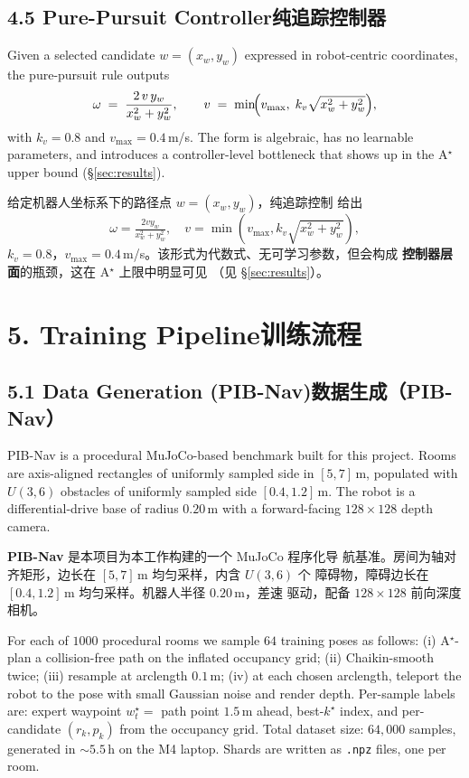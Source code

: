 \documentclass[11pt,a4paper]{article}
\providecommand{\citep}[1]{\cite{#1}}
\newcommand{\en}[1]{\par\noindent #1\par\vspace{0.15em}}
\newcommand{\zh}[1]{\par\noindent\color{zhcol}\hspace{0.5em}#1\par\color{black}\vspace{0.6em}}
\newcommand{\bisec}[2]{\section[#1]{#1\quad\normalfont\small\color{zhcol}\textsf{#2}}}
\newcommand{\bisubsec}[2]{\subsection[#1]{#1\quad\normalfont\small\color{zhcol}\textsf{#2}}}
\begin{document}
\bisubsec{4.5 Pure-Pursuit Controller}{纯追踪控制器}

\en{Given a selected candidate $w = (x_w, y_w)$ expressed in robot-centric
coordinates, the pure-pursuit rule \citep{Coulter1992} outputs
\begin{equation}
  \omega \;=\; \frac{2\,v\,y_w}{x_w^2 + y_w^2},
  \qquad
  v \;=\; \min\!\Bigl(v_{\max},\; k_v \sqrt{x_w^2 + y_w^2}\Bigr),
\end{equation}
with $k_v = 0.8$ and $v_{\max} = 0.4\,$m/s. The form is algebraic, has
no learnable parameters, and introduces a controller-level bottleneck that
shows up in the A$^\star$ upper bound (\S\ref{sec:results}).}

\zh{\textsf{给定机器人坐标系下的路径点 $w=(x_w,y_w)$，纯追踪控制
\citep{Coulter1992} 给出
\[
 \omega = \tfrac{2 v y_w}{x_w^2 + y_w^2},\quad
 v = \min(v_{\max}, k_v\sqrt{x_w^2 + y_w^2}),
\]
$k_v=0.8$，$v_{\max}=0.4\,$m/s。该形式为代数式、无可学习参数，但会构成
\textbf{控制器层面}的瓶颈，这在 A$^\star$ 上限中明显可见
（见 \S\ref{sec:results}）。}}

\bisec{5. Training Pipeline}{训练流程}

\bisubsec{5.1 Data Generation (PIB-Nav)}{数据生成（PIB-Nav）}

\en{\textsf{PIB-Nav} is a procedural MuJoCo-based benchmark built for this
project. Rooms are axis-aligned rectangles of uniformly sampled side in
$[5,7]\,$m, populated with $U(3,6)$ obstacles of uniformly sampled
side $[0.4,1.2]\,$m. The robot is a differential-drive base of radius
$0.20\,$m with a forward-facing $128\times 128$ depth camera.}

\zh{\textsf{\textbf{PIB-Nav} 是本项目为本工作构建的一个 MuJoCo 程序化导
航基准。房间为轴对齐矩形，边长在 $[5,7]\,$m 均匀采样，内含 $U(3,6)$ 个
障碍物，障碍边长在 $[0.4,1.2]\,$m 均匀采样。机器人半径 $0.20\,$m，差速
驱动，配备 $128\times 128$ 前向深度相机。}}

\en{For each of $1000$ procedural rooms we sample $64$ training poses as
follows: (i) A$^\star$-plan a collision-free path on the inflated
occupancy grid; (ii) Chaikin-smooth twice; (iii) resample at arclength
$0.1\,$m; (iv) at each chosen arclength, teleport the robot to the pose
with small Gaussian noise and render depth. Per-sample labels are:
expert waypoint $w^{\star}_t = $ path point $1.5\,$m ahead, best-$k^{\star}$
index, and per-candidate $(r_k, p_k)$ from the occupancy grid. Total
dataset size: $64{,}000$ samples, generated in $\sim 5.5\,$h on the M4
laptop. Shards are written as \texttt{.npz} files, one per room.}
\end{document}
